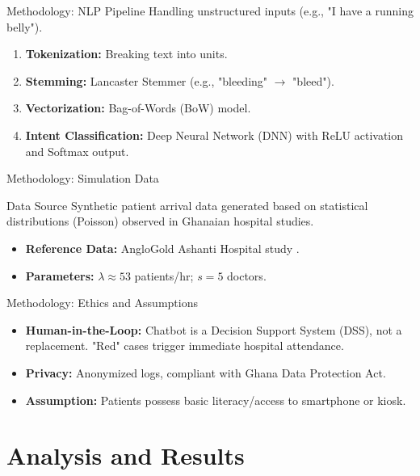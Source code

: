 \documentclass[aspectratio=169,12pt]{beamer}
\begin{document}
	\begin{frame}{Methodology: NLP Pipeline}
		Handling unstructured inputs (e.g., "I have a running belly").
		
		\begin{enumerate}
			\item \textbf{Tokenization:} Breaking text into units.
			\item \textbf{Stemming:} Lancaster Stemmer (e.g., "bleeding" $\to$ "bleed").
			\item \textbf{Vectorization:} Bag-of-Words (BoW) model.
			\item \textbf{Intent Classification:} Deep Neural Network (DNN) with ReLU activation and Softmax output.
		\end{enumerate}
	\end{frame}
	
	\begin{frame}{Methodology: Simulation Data}
		\begin{block}{Data Source}
			Synthetic patient arrival data generated based on statistical distributions (Poisson) observed in Ghanaian hospital studies.
		\end{block}
		
		\begin{itemize}
			\item \textbf{Reference Data:} AngloGold Ashanti Hospital study \citep{Afrane2014}.
			\item \textbf{Parameters:} $\lambda \approx 53$ patients/hr; $s=5$ doctors.
		\end{itemize}
	\end{frame}
	
	\begin{frame}{Methodology: Ethics and Assumptions}
		\begin{itemize}
			\item \textbf{Human-in-the-Loop:} Chatbot is a Decision Support System (DSS), not a replacement. "Red" cases trigger immediate hospital attendance.
			\item \textbf{Privacy:} Anonymized logs, compliant with Ghana Data Protection Act.
			\item \textbf{Assumption:} Patients possess basic literacy/access to smartphone or kiosk.
		\end{itemize}
	\end{frame}
	
	\section{Analysis and Results }
	
\end{document}
